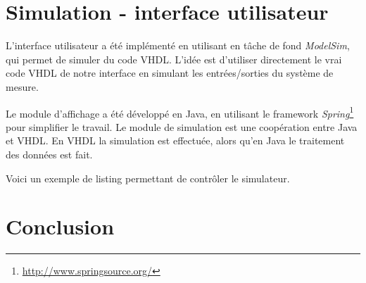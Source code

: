 \documentclass[a4paper,oneside,11pt]{article}  %
\begin{document}



\section{Simulation - interface utilisateur}


L'interface utilisateur a été implémenté en utilisant en tâche de fond \textit{ModelSim}, qui permet de simuler du code VHDL.
L'idée est d'utiliser directement le vrai code VHDL de notre interface en simulant les entrées/sorties du système de mesure.

Le module d'affichage a été développé en Java, en utilisant le framework \textit{Spring}\footnote{\url{http://www.springsource.org/}} pour simplifier le travail.
Le module de simulation est une coopération entre Java et VHDL.
En VHDL la simulation est effectuée, alors qu'en Java le traitement des données est fait.


Voici un exemple de listing permettant de contrôler le simulateur.




\section{Conclusion}

\end{document}
